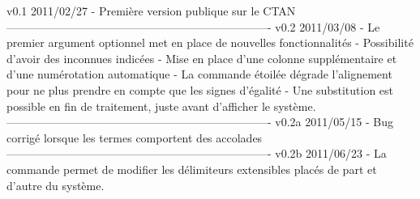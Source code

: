 v0.1        2011/02/27
	- Premi\`ere version publique sur le CTAN
----------------------------------------------------------------------
v0.2        2011/03/08
    - Le premier argument optionnel met en place de nouvelles
      fonctionnalit\'es
    - Possibilit\'e d'avoir des inconnues indic\'ees
    - Mise en place d'une colonne suppl\'ementaire et d'une
      num\'erotation automatique
    - La commande \'etoil\'ee \systeme* d\'egrade l'alignement pour ne
      plus prendre en compte que les signes d'\'egalit\'e
    - Une substitution est possible en fin de traitement, juste
      avant d'afficher le syst\`eme.
----------------------------------------------------------------------
v0.2a       2011/05/15
    - Bug corrig\'e lorsque les termes comportent des accolades
----------------------------------------------------------------------
v0.2b       2011/06/23
    - La commande \setdelim permet de modifier les d\'elimiteurs
      extensibles plac\'es de part et d'autre du syst\`eme.